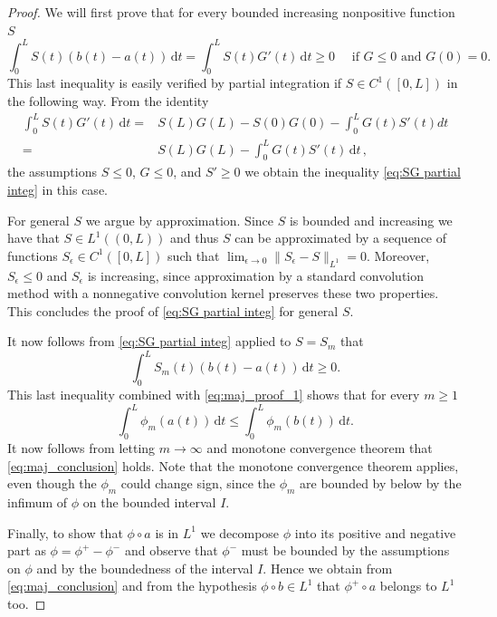 \documentclass[10pt,leqno]{amsart}
\newcommand{\dd}{\, \mathrm{d}}
\numberwithin{Theorem}{section}
\theoremstyle{definition}
\theoremstyle{remark}
\numberwithin{equation}{section}
\numberwithin{equation}{section}
\begin{document}
\begin{proof}
We will first prove that for every bounded increasing nonpositive function $S$ 
\begin{equation}\label{eq:SG partial integ}
  \int_0^L S(t)(b(t)-a(t))\dd t=\int_0^L S(t)G'(t)\dd t\geq 0\quad\text{ if $G\leq 0$ and $G(0)=0$}.
\end{equation}
This last inequality is easily verified by partial integration if $S\in C^1([0,L])$ in the following way. From the identity 
\begin{align*} 
\int_0^L S(t) G'(t) \dd t =& S(L)G(L) - S(0)G(0) - \int_0^L G(t) S'(t)dt\\
=&S(L)G(L)-\int_0^L G(t) S'(t)\dd t\,,
\end{align*}
the assumptions $S\leq 0$, $G\leq 0$, and $S'\geq 0$ we obtain the inequality \eqref{eq:SG partial integ} in this case. 


For general $S$ we argue by approximation. Since $S$ is bounded and increasing we have that  $S\in L^1((0,L))$ and thus $S$ can be approximated by a sequence of functions $S_{\epsilon}\in C^1([0,L])$ such that $\lim_{\epsilon\to 0} \|S_{\epsilon}-S\|_{L^1}=0.$ Moreover, $S_{\epsilon}\leq 0$ and $S_{\epsilon}$ is increasing, since approximation by a standard convolution method with a nonnegative convolution kernel preserves these two properties. This concludes the proof of \eqref{eq:SG partial integ} for general $S.$ 

It now follows from  \eqref{eq:SG partial integ} applied to $S=S_m$ that
\begin{equation}\label{eq:SG applied to Sm}
  \int_0^L S_m(t) (b(t) - a(t)) \dd t\geq 0. 
\end{equation}
This last inequality combined with \eqref{eq:maj_proof_1}  shows that  for every $m\geq1$
$$
  \int_0^L\phi_m(a(t))\dd t\leq \int_0^L\phi_m(b(t))\dd t.
$$
It now follows from letting $m\to\infty$ and  monotone convergence theorem that \eqref{eq:maj_conclusion} holds.  Note that the monotone convergence theorem applies, even though the $\phi_m$ could change sign, since the $\phi_m$ are bounded by below by the infimum of $\phi$ on the bounded interval $I.$

Finally, to show that $\phi\circ a$ is in $L^1$ we decompose $\phi$ into its positive and negative part as $\phi=\phi^+-\phi^-$ and observe that $\phi^-$ must be bounded by the assumptions on $\phi$ and by the boundedness of the interval $I.$ Hence we obtain from \eqref{eq:maj_conclusion} and from the hypothesis $\phi\circ b\in L^1$ that $\phi^+\circ a$ belongs to $L^1$ too.


\end{proof}
\end{document}
